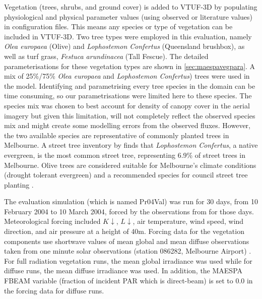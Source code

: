\documentclass[final,3p,times,authoryear]{elsarticle}
\begin{document}
Vegetation (trees, shrubs, and ground cover) is added to VTUF-3D by populating physiological and physical parameter values (using observed or literature values) in configuration files. This means any species or type of vegetation can be included in VTUF-3D. Two tree types were employed in this evaluation, namely \textit{Olea europaea} (Olive) and \textit{Lophostemon Confertus} (Queensland brushbox), as well as turf grass, \textit{Festuca arundinacea} (Tall Fescue). The detailed parameterisations for these vegetation types are shown in \ref{sec:maespavegpara}. A mix of 25\%/75\% \textit{Olea europaea} and \textit{Lophostemon Confertus}) trees were used in the model. Identifying and parametrising every tree species in the domain can be time consuming, so our parametrisations were limited here to these species. The species mix was chosen to best account for density of canopy cover in the aerial imagery but given this limitation, will not completely reflect the observed species mix and might create some modelling errors from the observed fluxes. However, the two available species are representative of commonly planted trees in Melbourne. A street tree inventory by \cite{Frank2006} finds that \textit{Lophostemon Confertus}, a native evergreen, is the most common street tree, representing 6.9\% of street trees in Melbourne. Olive trees are considered suitable for Melbourne's climate conditions (drought tolerant evergreen) and a recommended species for council street tree planting \citep{PortPhillip2010}.

The evaluation simulation (which is named Pr04Val) was run for 30 days, from 10 February 2004 to 10 March 2004, forced by the observations from \cite{Coutts2007} for those days. Meteorological forcing included $K\downarrow$, $L\downarrow$, air temperature, wind speed, wind direction, and air pressure at a height of 40m. Forcing data for the vegetation components use shortwave values of mean global and mean diffuse observations taken from one minute solar observations (station 086282, Melbourne Airport) \citep{BOM2016}. For full radiation vegetation runs, the mean global irradiance was used while for diffuse runs, the mean diffuse irradiance was used. In addition, the MAESPA FBEAM variable (fraction of incident PAR which is direct-beam) is set to 0.0 in the forcing data for diffuse runs.
\end{document}
